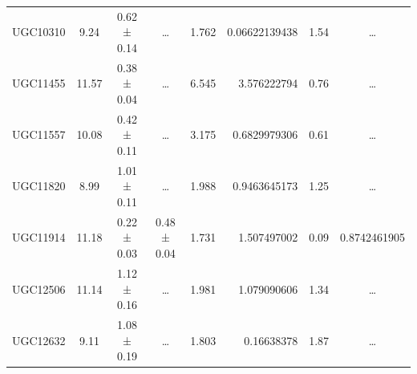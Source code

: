 \documentclass[reprint,%
 amsmath,amssymb,
 aps,
]{revtex4-1}
\begin{document}
\begin{table}[]
\begin{tabular}{cccccrrc}
\rowcolor[HTML]{F3F3F3} 
UGC10310             & 9.24                      & 0.62 ± 0.14           & …                      & 1.762                                                        & 0.06622139438                                                         & 1.54                                                            & …                                                             \\
\rowcolor[HTML]{F3F3F3} 
UGC11455             & 11.57                     & 0.38 ± 0.04           & …                      & 6.545                                                        & 3.576222794                                                           & 0.76                                                          & …                                                             \\
\rowcolor[HTML]{F3F3F3} 
UGC11557             & 10.08                     & 0.42 ± 0.11           & …                      & 3.175                                                        & 0.6829979306                                                          & 0.61                                                          & …                                                             \\
\rowcolor[HTML]{F3F3F3} 
UGC11820             & 8.99                      & 1.01 ± 0.11           & …                      & 1.988                                                        & 0.9463645173                                                          & 1.25                                                          & …                                                             \\
\rowcolor[HTML]{F3F3F3} 
UGC11914             & 11.18                     & 0.22 ± 0.03           & 0.48 ± 0.04            & 1.731                                                        & 1.507497002                                                           & 0.09                                                        & \multicolumn{1}{r}{\cellcolor[HTML]{F3F3F3}0.8742461905}      \\
\rowcolor[HTML]{F3F3F3} 
UGC12506             & 11.14                     & 1.12 ± 0.16           & …                      & 1.981                                                        & 1.079090606                                                           & 1.34                                                         & …                                                             \\
\rowcolor[HTML]{F3F3F3} 
UGC12632             & 9.11                      & 1.08 ± 0.19           & …                      & 1.803                                                        & 0.16638378                                                            & 1.87                                                           & …                                                             \\

\end{tabular}
\end{table}
\end{document}
